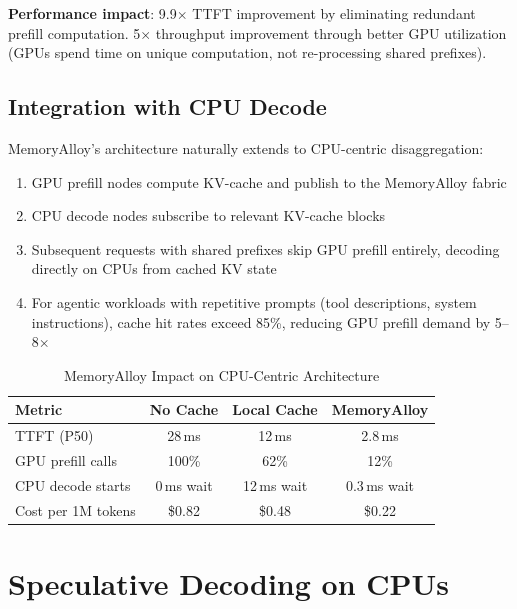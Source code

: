 \documentclass[conference,10pt]{IEEEtran}
\begin{document}
\textbf{Performance impact}: 9.9$\times$ TTFT improvement by eliminating redundant prefill computation. 5$\times$ throughput improvement through better GPU utilization (GPUs spend time on unique computation, not re-processing shared prefixes).

\subsection{Integration with CPU Decode}

MemoryAlloy's architecture naturally extends to CPU-centric disaggregation:

\begin{enumerate}
\item GPU prefill nodes compute KV-cache and publish to the MemoryAlloy fabric
\item CPU decode nodes subscribe to relevant KV-cache blocks
\item Subsequent requests with shared prefixes skip GPU prefill entirely, decoding directly on CPUs from cached KV state
\item For agentic workloads with repetitive prompts (tool descriptions, system instructions), cache hit rates exceed 85\%, reducing GPU prefill demand by 5--8$\times$
\end{enumerate}

\begin{table}[!htbp]
\caption{MemoryAlloy Impact on CPU-Centric Architecture}
\label{tab:memalloy}
\centering\footnotesize
\begin{tabular}{@{}lccc@{}}
\toprule
\textbf{Metric} & \textbf{No Cache} & \textbf{Local Cache} & \textbf{MemoryAlloy} \\
\midrule
TTFT (P50) & 28\,ms & 12\,ms & 2.8\,ms \\
GPU prefill calls & 100\% & 62\% & 12\% \\
CPU decode starts & 0\,ms wait & 12\,ms wait & 0.3\,ms wait \\
Cost per 1M tokens & \$0.82 & \$0.48 & \$0.22 \\
\bottomrule
\end{tabular}
\end{table}


\section{Speculative Decoding on CPUs}
\label{sec:spec}
\end{document}
